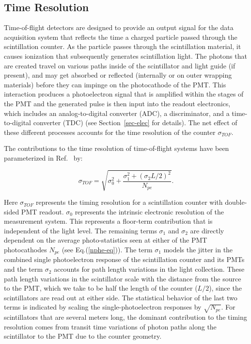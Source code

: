 \documentclass[final,3p,twocolumn]{elsarticle}
\begin{document}
\subsection{Time Resolution}
\label{res-sec}

Time-of-flight detectors are designed to provide an output signal for the data acquisition system that
reflects the time a charged particle passed through the scintillation counter. As the particle passes
through the scintillation material, it causes ionization that subsequently generates scintillation light. The
photons that are created travel on various paths inside of the scintillator and light guide (if present), and
may get absorbed or reflected (internally or on outer wrapping materials) before they can impinge on the
photocathode of the PMT. This interaction produces a photoelectron signal that is amplified within the
stages of the PMT and the generated pulse is then input into the readout electronics, which includes an
analog-to-digital converter (ADC), a discriminator, and a time-to-digital converter (TDC) (see
Section~\ref{sec-elec} for details). The net effect of these different processes accounts for the time
resolution of the counter $\sigma_{TOF}$.

The contributions to the time resolution of time-of-flight systems have been parameterized in
Ref.~\cite{kuhlen} by:

\begin{equation}
\label{timing-func}
\sigma_{TOF} = \sqrt{\sigma_0^2 + \frac{\sigma_1^2 + (\sigma_2 L/2)^2} {N_{pe}}}.
\end{equation}

Here $\sigma_{TOF}$ represents the timing resolution for a scintillation counter with double-sided PMT
readout. $\sigma_0$ represents the intrinsic electronic resolution of the measurement system. This
represents a floor-term contribution that is independent of the light level. The remaining terms
$\sigma_1$ and $\sigma_2$ are directly dependent on the average photo-statistics seen at either of
the PMT photocathodes $N_{pe}$ (see Eq.(\ref{nphe-eq})). The term $\sigma_1$ models the jitter in
the combined single photoelectron response of the scintillation counter and its PMTs and the term
$\sigma_2$ accounts for path length variations in the light collection.  These path length variations in
the scintillator scale with the distance from the source to the PMT, which we take to be half the length
of the counter ($L/2$), since the scintillators are read out at either side.  The statistical behavior of
the last two terms is indicated by scaling the single-photoelectron responses by $\sqrt{N_{pe}}$. For
scintillators that are several meters long, the dominant contribution to the timing resolution comes from
transit time variations of photon paths along the scintillator to the PMT due to the counter geometry.
\end{document}
